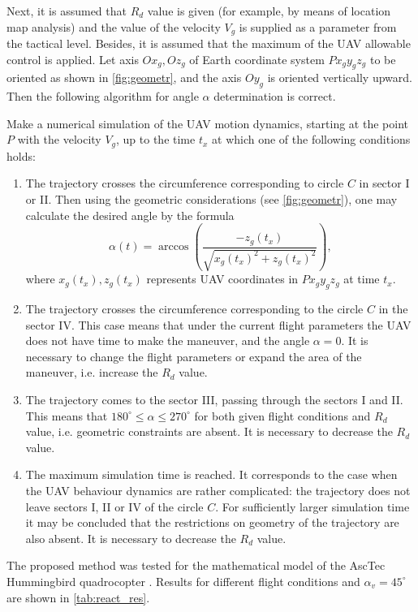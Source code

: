 \documentclass[review]{elsarticle}
\begin{document}
Next, it is assumed that $R_d$ value is given (for example, by means of location map analysis) and the value of the velocity $V_g$ is supplied as a parameter from the tactical level. Besides, it is assumed that the maximum of the UAV allowable control is applied. Let axis $Ox_g,Oz_g$ of Earth coordinate system $Px_gy_gz_g$ to be oriented as shown in \autoref{fig:geometr}, and the axis $Oy_g$ is oriented vertically upward. Then the following algorithm for angle $\alpha$ determination is correct. 

Make a numerical simulation of the UAV motion dynamics, starting at the point $P$ with the velocity $V_g$, up to the time $t_x$ at which one of the following conditions holds:
\begin{enumerate}
	\item The trajectory crosses the circumference corresponding to circle $C$ in sector I or II. Then using the geometric considerations (see \autoref{fig:geometr}), one may calculate the desired angle by the formula
	\[
	\alpha (t)=\arccos \left( \frac{-{{z}_{g}}({{t}_{x}})}{\sqrt{{{x}_{g}}{{({{t}_{x}})}^{2}}+{{z}_{g}}{{({{t}_{x}})}^{2}}}} \right),
	\]
	where ${{x}_{g}}({{t}_{x}}),{{z}_{g}}({{t}_{x}})$ represents UAV coordinates in $Px_gy_gz_g$ at time $t_x$.
	\item The trajectory crosses the circumference corresponding to the circle $C$ in the sector IV. This case means that under the current flight parameters the UAV does not have time to make the maneuver, and the angle $\alpha=0$. It is necessary to change the flight parameters or expand the area of the maneuver, i.e. increase the $R_d$ value.
	\item The trajectory comes to the sector III, passing through the sectors I and II. This means that $180^\circ\leq\alpha\leq 270^\circ$ for both given flight conditions and $R_d$ value, i.e. geometric constraints are absent. It is necessary to decrease the $R_d$ value.
	\item The maximum simulation time is reached. It corresponds to the case when the UAV behaviour dynamics are rather complicated: the trajectory does not leave sectors I, II or IV of the circle $C$. For sufficiently larger simulation time it may be concluded that the restrictions on geometry of the trajectory are also absent. It is necessary to decrease the $R_d$ value.
\end{enumerate}

The proposed method was tested for the mathematical model of the AscTec Hummingbird quadrocopter \cite{AsTec}. Results for different flight conditions and $\alpha_v=45^\circ$ are shown in \autoref{tab:react_res}.
\end{document}
